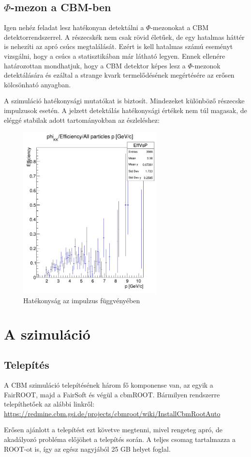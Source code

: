 \documentclass[a4paper,12pt]{article}
\begin{document}
\subsection{$\Phi$-mezon a CBM-ben}
\vspace{5mm}
\par Igen nehéz feladat lesz hatékonyan detektálni a $\Phi$-mezonokat a CBM detektorrendszerrel. A részecskék nem csak rövid 
életűek, de egy hatalmas háttér is nehezíti az apró csúcs megtalálását. Ezért is kell hatalmas számú eseményt vizsgálni, hogy a csúcs
a statisztikában már látható legyen. Ennek ellenére határozottan mondhatjuk, hogy a CBM detektor képes lesz a $\Phi$-mezonok detektálására
és ezáltal a strange kvark termelődésének megértésére az erősen kölcsönható anyagban.
\vspace{5mm}
\par A szimuláció hatékonysági mutatókat is biztosít. Mindezeket különböző részecske impulzusok esetén. A jelzett detektálás 
hatékonysági értékek nem túl magasak, de eléggé stabilak adott tartományokban az észleléshez:
\begin{figure}[H]
	\centering
	\includegraphics[width=0.65\textwidth]{efficieny.png}
	\caption{ Hatékonyság az impulzus függvényében }
\end{figure}
\section{ A szimuláció}
\vspace{3mm}
\subsection{ Telepítés}
\vspace{5mm}
\par A CBM szimuláció telepítésének három fő komponense van, az egyik a FairROOT, majd a FairSoft és végül a cbmROOT. Bármilyen 
rendszerre telepíthetőek az alábbi linkről:
\url{https://redmine.cbm.gsi.de/projects/cbmroot/wiki/InstallCbmRootAuto} \newline
\par Erősen ajánlott a telepítést ezt követve megtenni, mivel rengeteg apró, de akadályozó probléma előjöhet a telepítés során. A teljes
csomag tartalmazza a ROOT-ot is, így az egész nagyjából 25 GB helyet foglal. 
\end{document}
